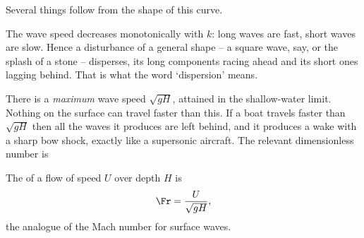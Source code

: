 \begin{center}
\end{center}

Several things follow from the shape of this curve.

The wave speed decreases monotonically with $k$: long waves are fast, short waves are slow. Hence a disturbance of a general shape -- a square wave, say, or the splash of a stone -- disperses, its long components racing ahead and its short ones lagging behind. That is what the word `dispersion' means.

There is a \emph{maximum} wave speed $\sqrt{gH}$, attained in the shallow-water limit. Nothing on the surface can travel faster than this. If a boat travels faster than $\sqrt{gH}$ then all the waves it produces are left behind, and it produces a wake with a sharp bow shock, exactly like a supersonic aircraft. The relevant dimensionless number is

\begin{definition}
	The  of a flow of speed $U$ over depth $H$ is
	$$
	\Fr = \frac{U}{\sqrt{gH}},
	$$
	the analogue of the Mach number for surface waves.
\end{definition}

